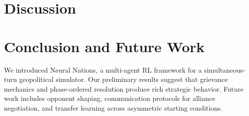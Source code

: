 \documentclass[11pt, a4paper, onecolumn]{article} %
\begin{document}
\section{Discussion}


\section{Conclusion and Future Work}

We introduced Neural Nations, a multi-agent RL framework for a simultaneous-turn geopolitical simulator. Our preliminary results suggest that grievance mechanics and phase-ordered resolution produce rich strategic behavior. Future work includes opponent shaping, communication protocols for alliance negotiation, and transfer learning across asymmetric starting conditions.


\printbibliography[title={Bibliography}]

\end{document}
